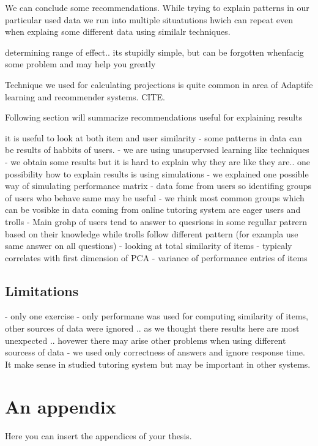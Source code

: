 \documentclass[
  digital, %
  table,   %
  nolof,     %
  nolot,     %
  nocover
]{fithesis3}
\begin{document}
We can conclude some recommendations. While trying to explain patterns
in our particular used data we run into multiple situatutions hwich can
repeat even when explaing some different data using similalr techniques.


determining range of effect.. its stupidly simple, but can be forgotten whenfacig some problem and may help you greatly


Technique we used for calculating projections is quite common in area of
Adaptife learning and recommender systems. CITE.


Following section will summarize recommendations useful for explaining
results

it is useful to look at both item and user similarity - some
patterns in data can be results of habbits of users. - we are using
unsupervsed learning like techniques - we obtain some results but it is
hard to explain why they are like they are.. one possibility how to
explain results is using simulations - we explained one possible way of
simulating performance matrix - data fome from users so identifing
groups of users who behave same may be useful - we rhink most common
groups which can be vosibke in data coming from online tutoring system
are eager users and trolls - Main grohp of users tend to answer to
quesrions in some regullar patrern based on their knowledge while trolls
follow different pattern (for exampla use same answer on all questions)
- looking at total similarity of items - typicaly correlates with first
dimension of PCA - variance of performance entries of items



\section{Limitations}\label{limitations}

- only one exercise
- only performane was used for computing similarity of items, other sources of data were ignored .. as we thought there results here are most unexpected .. hovewer there may arise other problems when using different sourcess of data
- we used only correctness of answers and ignore response time. It make sense in studied tutoring system but may be important in other systems.


  \makeatletter\thesis@blocks@clear\makeatother

\appendix %
\chapter{An appendix}
Here you can insert the appendices of your thesis.
\end{document}
